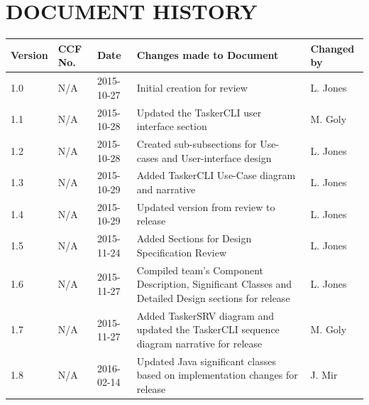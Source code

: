 \documentclass{project}
\begin{document}
\section*{DOCUMENT HISTORY}
\begin{tabular}{|l | l | l | p{8cm} |l | }
\hline
Version & CCF No. & Date & Changes made to Document & Changed by \\
\hline
1.0 & N/A & 2015-10-27 & Initial creation for review & L. Jones \\
\hline
1.1 & N/A & 2015-10-28 & Updated the TaskerCLI user interface section & M. Goly \\
\hline
1.2 & N/A & 2015-10-28 & Created sub-subsections for  Use-cases and User-interface design & L. Jones \\
\hline
1.3 & N/A & 2015-10-29 & Added TaskerCLI Use-Case diagram and narrative & L. Jones \\
\hline
1.4 & N/A & 2015-10-29 & Updated version from review to release & L. Jones \\
\hline
1.5 & N/A & 2015-11-24 & Added Sections for Design Specification Review & L. Jones \\
\hline
1.6 & N/A & 2015-11-27 & Compiled team's  Component Description, Significant Classes and Detailed Design sections for release & L. Jones \\
\hline
1.7 & N/A & 2015-11-27 & Added TaskerSRV diagram and updated the TaskerCLI sequence diagram narrative for release & M. Goly \\
\hline
1.8 & N/A & 2016-02-14 & Updated Java significant classes based on implementation changes for release & J. Mir \\
\hline
\end{tabular}
\label{thelastpage}
\end{document}
